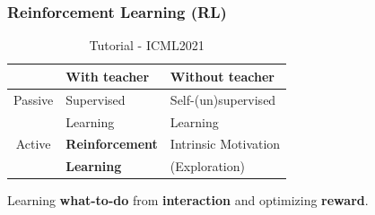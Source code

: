 \documentclass[10pt]{beamer}
\theoremstyle{remark}
\begin{document}
\begin{frame}
    \frametitle{Reinforcement Learning (RL)}
    \begin{table}[c]
        \begin{tabular}{c|p{3cm}|p{4cm}}
            & With teacher & Without teacher \\
            \hline
            Passive & Supervised & Self-(un)supervised \\
                    & Learning & Learning \\
            \hline
            Active & \textbf{Reinforcement} & Intrinsic Motivation \\
                   & \textbf{Learning} & (Exploration) \\ 
            \hline
        \end{tabular}
        \caption{Tutorial - ICML2021}
    \end{table}
    Learning \textbf{what-to-do} from \textbf{interaction} and optimizing \textbf{reward}.
\end{frame}
\end{document}
